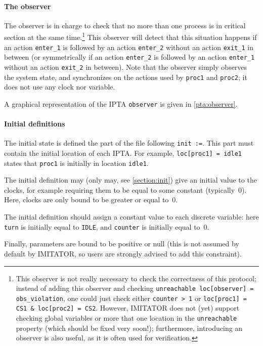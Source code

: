 \documentclass[a4paper,11pt]{report}
\newcommand{\imitator}{\textsf{IMITATOR}}
\newcommand{\IPTA}{IPTA}
\newcommand{\styleIMI}[1]{\textcolor{imicolor}{\texttt{#1}}}
\begin{document}
\paragraph{The observer}
The observer is in charge to check that no more than one process is in critical section at the same time.\footnote{%
	This observer is not really necessary to check the correctness of this protocol;
	instead of adding this observer and checking \styleIMI{unreachable loc[observer] = obs\_violation}, one could just check either \styleIMI{counter > 1} or \styleIMI{loc[proc1] = CS1 \& loc[proc2] = CS2}.
	However, \imitator{} does not (yet) support checking global variables or more that one location in the \styleIMI{unreachable} property (which should be fixed very soon!); furthermore, introducing an observer is also useful, as it is often used for verification.
}
This observer will detect that this situation happens if an action \styleIMI{enter\_1} is followed by an action \styleIMI{enter\_2} without an action \styleIMI{exit\_1} in between (or symmetrically if an action \styleIMI{enter\_2} is followed by an action \styleIMI{enter\_1} without an action \styleIMI{exit\_2} in between).
Note that the observer simply observes the system state, and synchronizes on the actions used by \styleIMI{proc1} and \styleIMI{proc2}; it does not use any clock nor variable.

A graphical representation of the \IPTA{} \styleIMI{observer} is given in \cref{pta:observer}.


\paragraph{Initial definitions}
The initial state is defined the part of the file following \styleIMI{init :=}.
This part must contain the initial location of each \IPTA{}.
For example, \styleIMI{loc[proc1] = idle1} states that \styleIMI{proc1} is initially in location \styleIMI{idle1}.

The initial definition may (only may, see \cref{section:init}) give an initial value to the clocks, for example requiring them to be equal to some constant (typically~0).
Here, clocks are only bound to be greater or equal to~0.

The initial definition should assign a constant value to each discrete variable:
here \styleIMI{turn} is initially equal to \styleIMI{IDLE}, and \styleIMI{counter} is initially equal to~0.

Finally, parameters are bound to be positive or null (this is not assumed by default by \imitator{}, so users are strongly advised to add this constraint).
\end{document}
